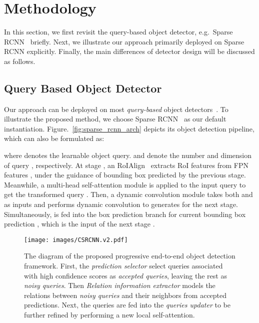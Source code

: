 \documentclass[final]{cvpr}
\begin{document}
\section{Methodology}

In this section, we first revisit the query-based object detector, e.g.\ Sparse RCNN~\cite{sun2020sparse} briefly. Next, we illustrate our approach primarily deployed on Sparse RCNN explicitly. Finally, the main differences of detector design will be discussed as follows.

\subsection{Query Based Object Detector}
Our approach can be deployed on most \emph{query-based} object detectors~\cite{carion2020end, sun2020sparse, zhu2021deformable}. To illustrate the proposed method, we choose Sparse RCNN~\cite{sun2020sparse} as our default instantiation. Figure.~\ref{fig:sparse_rcnn_arch} depicts its object detection pipeline, which can also be formulated as:


where  denotes the learnable object query.  and  denote the number and dimension of query , respectively. At stage , an RoIAlign~\cite{he2017mask}  extracts RoI features from FPN features , under the guidance of bounding box  predicted by the previous stage. Meanwhile, a multi-head self-attention module  is applied to the input query  to get the transformed query . Then, a dynamic convolution module  takes both  and  as inputs and performs dynamic convolution to generates  for the next stage. Simultaneously,  is fed into the box prediction branch  for current bounding box prediction , which is the input of the next stage .


\begin{figure*}[htbp]
  \centering
  \texttt{[image: images/CSRCNN.v2.pdf]}
\caption{The diagram of the proposed progressive end-to-end object detection framework. First, the \emph{prediction selector} select queries associated with high confidence scores as \emph{accepted queries}, leaving the rest as \emph{noisy queries}. Then \emph{Relation information extractor} models the relations between \emph{noisy queries} and their neighbors from accepted predictions. Next, the queries are fed into the \emph{queries updater} to be further refined by performing a new local self-attention.}
\label{fig:framwork}
\vspace{-1.5pc}
\end{figure*}
\end{document}
